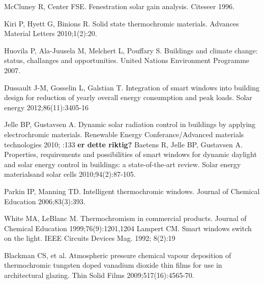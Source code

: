 \begin{thebibliography}{9}

      McCluney R, Center FSE. 
      Fenestration solar gain analysis. 
      Citeseer 1996.
      
      Kiri P, Hyett G, Binions R.
      Solid state thermochromic materials.
      Advances Material Letters 2010;1(2):20.

      Huovila P, Ala-Juusela M, Melchert L, Pouffary S. 
      Buildings and climate change: status, challanges and opportunities.
      United Nations Environment Programme 2007.

      Dussault J-M, Gosselin L, Galstian T. 
      Integration of smart windows into building design for reduction of yearly overall 
      energy consumption and peak loads.
      Solar energy 2012;86(11):3405-16

      Jelle BP, Gustavsen A.
      Dynamic solar radiation control in buildings by applying electrochromic materials.
      Renewable Energy Conferance/Advanced materials technologies 2010; :133%
      \textbf{er dette riktig?}
      Baetens R, Jelle BP, Gustavsen A. Properties, requirements and possibilities of smart windows
      for dynamic daylight and solar energy control in buildings: a state-of-the-art review.
      Solar energy materialsand solar cells 2010;94(2):87-105.

      Parkin IP, Manning TD.
      Intelligent thermochromic windows.
      Journal of Chemical Education 2006;83(3):393.

      White MA, LeBlanc M.
      Thermochromism in commercial products.
      Journal of Chemical Education 1999;76(9):1201,1204 %
      Lampert CM.
      Smart windows switch on the light.
      IEEE Circuits Devices Mag. 1992; 8(2):19 %

      Blackman CS, et al. 
      Atmospheric pressure chemical vapour deposition of thermochromic tungsten doped vanadium dioxide 
      thin films for use in architectural glazing. 
      Thin Solid Films 2009;517(16):4565-70.


\end{thebibliography}
